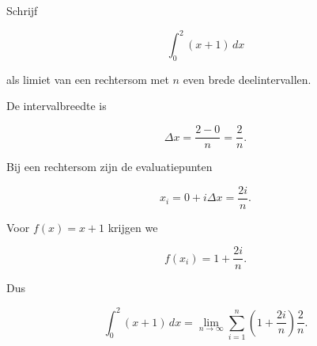 \documentclass{ximera}
\begin{document}

\begin{oefening}{\oefU\ESS}

Schrijf

\[
\int_0^2(x+1)\,dx
\]

als limiet van een rechtersom met \(n\) even brede deelintervallen.

\begin{oplossing}
De intervalbreedte is

\[
\Delta x=\frac{2-0}{n}=\frac2n.
\]

Bij een rechtersom zijn de evaluatiepunten

\[
x_i=0+i\Delta x=\frac{2i}{n}.
\]

Voor \(f(x)=x+1\) krijgen we

\[
f(x_i)=1+\frac{2i}{n}.
\]

Dus

\[
\boxed{
\int_0^2(x+1)\,dx
=
\lim_{n\to\infty}
\sum_{i=1}^{n}
\left(1+\frac{2i}{n}\right)\frac2n
}.
\]
\end{oplossing}

\end{oefening}


\end{document}
